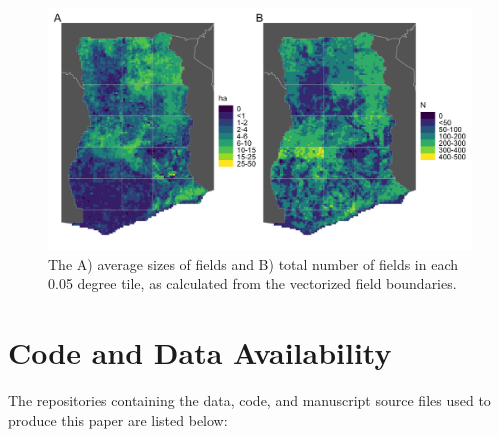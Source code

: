 \documentclass[
  11pt,
  a4paper]{article}
\begin{document}
\begin{figure}[!ht]

{\centering \includegraphics[width=0.9\linewidth,]{figures/si_fsize_n_05} 

}

\caption{The A) average sizes of fields and B) total number of fields in each 0.05 degree tile, as calculated from the vectorized field boundaries.}\label{fig:fieldsizes}
\end{figure}

\hypertarget{code-and-data-availability}{%
\section{Code and Data Availability}\label{code-and-data-availability}}

The repositories containing the data, code, and manuscript source files
used to produce this paper are listed below:
\end{document}
